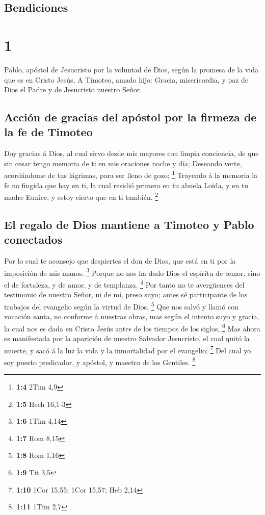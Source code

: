 \hypertarget{bendiciones}{%
\subsection{Bendiciones}\label{bendiciones}}

\hypertarget{section}{%
\section{1}\label{section}}

 Pablo, apóstol de Jesucristo por la voluntad de Dios, según
la promesa de la vida que es en Cristo Jesús,  A Timoteo,
amado hijo: Gracia, misericordia, y paz de Dios el Padre y de Jesucristo
nuestro Señor.

\hypertarget{acciuxf3n-de-gracias-del-apuxf3stol-por-la-firmeza-de-la-fe-de-timoteo}{%
\subsection{Acción de gracias del apóstol por la firmeza de la fe de
Timoteo}\label{acciuxf3n-de-gracias-del-apuxf3stol-por-la-firmeza-de-la-fe-de-timoteo}}

 Doy gracias á Dios, al cual sirvo desde mis mayores con
limpia conciencia, de que sin cesar tengo memoria de ti en mis oraciones
noche y día;  Deseando verte, acordándome de tus lágrimas,
para ser lleno de gozo; \footnote{\textbf{1:4} 2Tim 4,9} 
Trayendo á la memoria la fe no fingida que hay en ti, la cual residió
primero en tu abuela Loida, y en tu madre Eunice; y estoy cierto que en
ti también. \footnote{\textbf{1:5} Hech 16,1-3}

\hypertarget{el-regalo-de-dios-mantiene-a-timoteo-y-pablo-conectados}{%
\subsection{El regalo de Dios mantiene a Timoteo y Pablo
conectados}\label{el-regalo-de-dios-mantiene-a-timoteo-y-pablo-conectados}}

 Por lo cual te aconsejo que despiertes el don de Dios, que
está en ti por la imposición de mis manos. \footnote{\textbf{1:6} 1Tim
  4,14}  Porque no nos ha dado Dios el espíritu de temor,
sino el de fortaleza, y de amor, y de templanza. \footnote{\textbf{1:7}
  Rom 8,15}  Por tanto no te avergüences del testimonio de
nuestro Señor, ni de mí, preso suyo; antes sé participante de los
trabajos del evangelio según la virtud de Dios, \footnote{\textbf{1:8}
  Rom 1,16}  Que nos salvó y llamó con vocación santa, no
conforme á nuestras obras, mas según el intento suyo y gracia, la cual
nos es dada en Cristo Jesús antes de los tiempos de los siglos,
\footnote{\textbf{1:9} Tit 3,5}  Mas ahora es manifestada
por la aparición de nuestro Salvador Jesucristo, el cual quitó la
muerte, y sacó á la luz la vida y la inmortalidad por el evangelio;
\footnote{\textbf{1:10} 1Cor 15,55; 1Cor 15,57; Heb 2,14} 
Del cual yo soy puesto predicador, y apóstol, y maestro de los Gentiles.
\footnote{\textbf{1:11} 1Tim 2,7}

